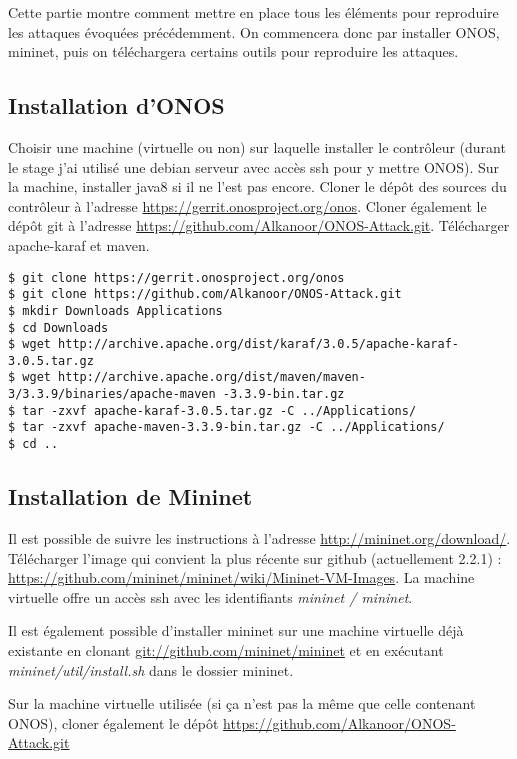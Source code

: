 Cette partie montre comment mettre en place tous les éléments pour reproduire les attaques évoquées précédemment. On commencera donc par installer ONOS, mininet, puis on téléchargera certains outils pour reproduire les attaques.

\subsection{Installation d'ONOS}

Choisir une machine (virtuelle ou non) sur laquelle installer le contrôleur (durant le stage j'ai utilisé une debian serveur avec accès ssh pour y mettre ONOS). Sur la machine, installer java8 si il ne l'est pas encore. Cloner le dépôt des sources du contrôleur à l'adresse \url{https://gerrit.onosproject.org/onos}. Cloner également le dépôt git à l'adresse \url{https://github.com/Alkanoor/ONOS-Attack.git}. Télécharger apache-karaf et maven.

\begin{verbatim}
$ git clone https://gerrit.onosproject.org/onos
$ git clone https://github.com/Alkanoor/ONOS-Attack.git
$ mkdir Downloads Applications
$ cd Downloads
$ wget http://archive.apache.org/dist/karaf/3.0.5/apache-karaf-3.0.5.tar.gz
$ wget http://archive.apache.org/dist/maven/maven-3/3.3.9/binaries/apache-maven -3.3.9-bin.tar.gz
$ tar -zxvf apache-karaf-3.0.5.tar.gz -C ../Applications/
$ tar -zxvf apache-maven-3.3.9-bin.tar.gz -C ../Applications/
$ cd ..
\end{verbatim}

\subsection{Installation de Mininet}

Il est possible de suivre les instructions à l'adresse \url{http://mininet.org/download/}. Télécharger l'image qui convient la plus récente sur github (actuellement 2.2.1) : \url{https://github.com/mininet/mininet/wiki/Mininet-VM-Images}. La machine virtuelle offre un accès ssh avec les identifiants \textit{mininet / mininet}.

Il est également possible d'installer mininet sur une machine virtuelle déjà existante en clonant \url{git://github.com/mininet/mininet} et en exécutant \textit{mininet/util/install.sh} dans le dossier mininet.

Sur la machine virtuelle utilisée (si ça n'est pas la même que celle contenant ONOS), cloner également le dépôt \url{https://github.com/Alkanoor/ONOS-Attack.git}

